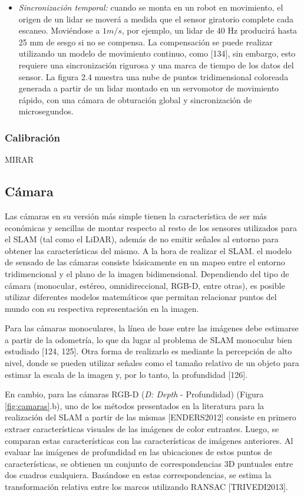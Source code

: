 \begin{itemize}
    \item \textit{Sincronización temporal:} cuando se monta en un robot en movimiento, el origen de un lidar se moverá a medida que el sensor giratorio complete cada escaneo. Moviéndose a $1m/s$, por ejemplo, un lidar de 40 Hz producirá hasta 25 mm de sesgo si no se compensa. La compensación se puede realizar utilizando un modelo de movimiento continuo, como [134], sin embargo, esto requiere una sincronización rigurosa y una marca de tiempo de los datos del sensor. La figura 2.4 muestra una nube de puntos tridimensional coloreada generada a partir de un lidar montado en un servomotor de movimiento rápido, con una cámara de obturación global y sincronización de microsegundos.
\end{itemize}

\subsubsection{Calibración}
MIRAR

\subsection{Cámara}
Las cámaras en su versión más simple tienen la característica de ser más económicas y sencillas de montar respecto al resto de los sensores utilizados para el SLAM (tal como el LiDAR), además de no emitir señales al entorno para obtener las características del mismo. A la hora de realizar el SLAM. el modelo de sensado de las cámaras consiste básicamente en un mapeo entre el entorno tridimencional y el plano de la imagen bidimensional. Dependiendo del tipo de cámara (monocular, estéreo, omnidireccional, RGB-D, entre otras), es posible utilizar diferentes modelos matemáticos que permitan relacionar puntos del mundo con su respectiva representación en la imagen.

Para las cámaras monoculares, la línea de base entre las imágenes debe estimarse a partir de la odometría, lo que da lugar al problema de SLAM monocular bien estudiado [124, 125]. Otra forma de realizarlo es mediante la percepción de alto nivel, donde se pueden utilizar señales como el tamaño relativo de un objeto para estimar la escala de la imagen y, por lo tanto, la profundidad [126].

En cambio, para las cámaras RGB-D (\textit{D: Depth} - Profundidad) (Figura \ref{fig:camaras}.b), uno de los métodos presentados en la literatura para la realización del SLAM a partir de las mismas [ENDERS2012] consiste en primero extraer características visuales de las imágenes de color entrantes. Luego, se comparan estas características con las características de imágenes anteriores. Al evaluar las imágenes de profundidad en las ubicaciones de estos puntos de características, se obtienen un conjunto de correspondencias 3D puntuales entre dos cuadros cualquiera. Basándose en estas correspondencias, se estima la transformación relativa entre los marcos utilizando RANSAC [TRIVEDI2013].

